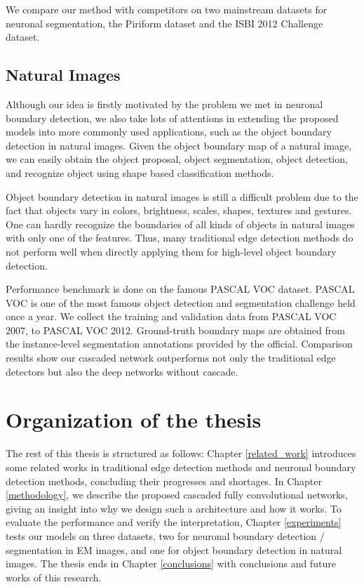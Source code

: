 \documentclass[senior]{IPSstyle}
\begin{document}
We compare our method with competitors on two mainstream datasets for neuronal segmentation, the Piriform dataset\cite{Lee2015} and the ISBI 2012 Challenge dataset\cite{Ronneberger2015}.

\subsection{Natural Images}
Although our idea is firstly motivated by the problem we met in neuronal boundary detection, we also take lots of attentions in extending the proposed models into more commonly used applications, such as the object boundary detection in natural images. Given the object boundary map of a natural image, we can easily obtain the object proposal, object segmentation\cite{Arbelaez2011, Pinheiro2015}, object detection\cite{Everingham2010, Girshick2015}, and recognize object using shape based classification methods\cite{Wang2014, Shen2014CCPR, Shen2016PRL}.

Object boundary detection in natural images is still a difficult problem due to the fact that objects vary in colors, brightness, scales, shapes, textures and gestures. One can hardly recognize the boundaries of all kinds of objects in natural images with only one of the features. Thus, many traditional edge detection methods\cite{Canny1986, Sobel2014} do not perform well when directly applying them for high-level object boundary detection. 

Performance benchmark is done on the famous PASCAL VOC dataset\cite{Everingham2010}. PASCAL VOC is one of the most famous object detection and segmentation challenge held once a year. We collect the training and validation data from PASCAL VOC 2007, to PASCAL VOC 2012. Ground-truth boundary maps are obtained from the instance-level segmentation annotations provided by the official. Comparison results show our cascaded network outperforms not only the traditional edge detectors but also the deep networks without cascade.



\section{Organization of the thesis}
The rest of this thesis is structured as follows: Chapter \ref{related_work}  introduces some related works in traditional edge detection methods and neuronal boundary detection methods, concluding their progresses and shortages. In Chapter \ref{methodology}, we describe the proposed cascaded fully convolutional networks, giving an insight into why we design such a architecture and how it works. To evaluate the performance and verify the interpretation, Chapter \ref{experiments} tests our models on three datasets, two for neuronal boundary detection / segmentation in EM images, and one for object boundary detection in natural images. The thesis ends in Chapter \ref{conclusions} with conclusions and future works of this research.
\end{document}
